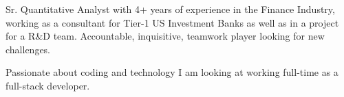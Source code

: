 

\begin{cvparagraph}

Sr. Quantitative Analyst with 4+ years of experience in the Finance Industry, working as a consultant for Tier-1 US Investment Banks as well as in a project for a R\&D team. Accountable, inquisitive, teamwork player looking for new challenges.

Passionate about coding and technology I am looking at working full-time as a full-stack developer.
\end{cvparagraph}
